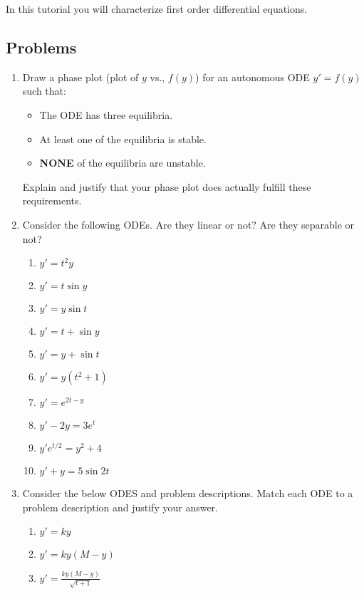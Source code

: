 \begin{objectives}
	In this tutorial you will characterize first order differential equations.
\end{objectives}

\subsection*{Problems}
\begin{enumerate}
\item Draw a phase plot (plot of $y$ vs., $f(y)$) for an autonomous ODE $y'=f(y)$ such that:
\begin{itemize}[nosep]
	\item The ODE has three equilibria.
	\item At least one of the equilibria is stable.
	\item \textbf{NONE} of the equilibria are unstable.
\end{itemize}
Explain and justify that your phase plot does actually fulfill these requirements.

\item Consider the following ODEs. Are they linear or not? Are they separable or not?
\begin{tcolorbox}[sharp corners=all,colframe=tolGrey,colback=white]
    \begin{multicols}{2}
    \begin{enumerate}[label={(\roman{enumii})},nosep,itemsep=1mm]
        \item $y'=t^2y$
        \item $y'=t\sin y$
        \item $y'=y\sin t$
        \item $y'=t+\sin y$
        \item $y'=y+\sin t$
        \item $y'=y(t^2+1)$
        \item $y'=e^{2t-y}$
        \item $y'-2y=3e^t$
        \item $y'e^{t/2}=y^2+4$
        \item $y'+y=5\sin 2t$
    \end{enumerate}
    \end{multicols}
\end{tcolorbox}

\item Consider the below ODES and problem descriptions. Match each ODE to a problem description and justify your answer.
\begin{tcolorbox}[sharp corners=all,colframe=tolGrey,colback=white]
    \begin{multicols}{2}
    \begin{enumerate}[label={(\roman{enumii})},nosep,itemsep=1mm]
        \item $y'=ky$
        \item $y'=ky(M-y)$
        \item $y'=\frac{ky(M-y)}{\sqrt{t+1}}$
    \end{enumerate}
    \end{multicols}
\end{tcolorbox}


\end{enumerate}
